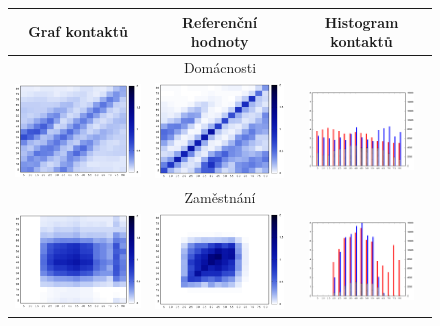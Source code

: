 \begin{figure}
\begin{center}
\begin{tabular}{|ccc|}
      \hline
      Graf kontaktů & Referenční hodnoty & Histogram kontaktů\\
      \hline
      \hline
      \multicolumn{3}{|c|}{Domácnosti} \\
      \includegraphics[width=38mm]{pic/home_mat.eps} &
      \includegraphics[width=38mm]{pic/home_mat_ref.eps} &
      \includegraphics[width=28mm]{pic/home.eps}\\
      \hline
      \multicolumn{3}{|c|}{Zaměstnání} \\
      \includegraphics[width=38mm]{pic/work_mat.eps} &
      \includegraphics[width=38mm]{pic/work_mat_ref.eps} &
      \includegraphics[width=28mm]{pic/work.eps}\\

\end{tabular}
\end{center}
\end{figure}
